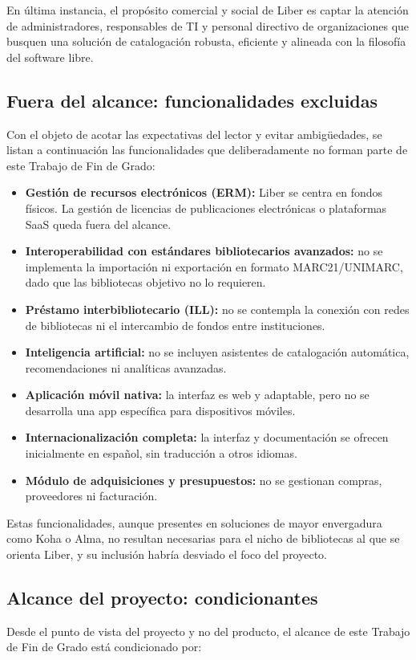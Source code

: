 En última instancia, el propósito comercial y social de Liber es captar la 
atención de administradores, responsables de TI y personal directivo de 
organizaciones que busquen una solución de catalogación robusta, 
eficiente y alineada con la filosofía del software libre.

\subsection{Fuera del alcance: funcionalidades excluidas}
Con el objeto de acotar las expectativas del lector y evitar ambigüedades, 
se listan a continuación las funcionalidades que deliberadamente no forman 
parte de este Trabajo de Fin de Grado:

\begin{itemize}
	\item \textbf{Gestión de recursos electrónicos (ERM):} Liber se centra en 
	fondos físicos. La gestión de licencias de publicaciones electrónicas o 
	plataformas SaaS queda fuera del alcance.
	\item \textbf{Interoperabilidad con estándares bibliotecarios avanzados:} no 
	se implementa la importación ni exportación en formato MARC21/UNIMARC, dado 
	que las bibliotecas objetivo no lo requieren.
	\item \textbf{Préstamo interbibliotecario (ILL):} no se contempla la conexión 
	con redes de bibliotecas ni el intercambio de fondos entre instituciones.
	\item \textbf{Inteligencia artificial:} no se incluyen asistentes de 
	catalogación automática, recomendaciones ni analíticas avanzadas.
	\item \textbf{Aplicación móvil nativa:} la interfaz es web y adaptable, pero 
	no se desarrolla una app específica para dispositivos móviles.
	\item \textbf{Internacionalización completa:} la interfaz y documentación se ofrecen
	inicialmente en español, sin traducción a otros idiomas.
	\item \textbf{Módulo de adquisiciones y presupuestos:} no se gestionan 
	compras, proveedores ni facturación.
\end{itemize}

Estas funcionalidades, aunque presentes en soluciones de mayor envergadura 
como Koha o Alma, no resultan necesarias para el nicho de bibliotecas al que 
se orienta Liber, y su inclusión habría desviado el foco del proyecto.

\subsection{Alcance del proyecto: condicionantes}
Desde el punto de vista del proyecto y no del producto, el alcance de este 
Trabajo de Fin de Grado está condicionado por:

